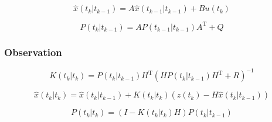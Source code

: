\documentclass[a4paper]{report}
\numberwithin{equation}{chapter}
\begin{document}
\begin{equation}
\hat{x} \left( t_k|t_{k-1} \right) = A\hat{x} \left( t_{k-1}|t_{k-1} \right) + Bu \left( t_k \right)
\end{equation}

\begin{equation}
P \left( t_k|t_{k-1} \right) = A P \left( t_{k-1}|t_{k-1} \right) A^{\mathrm{T}} + Q
\end{equation}

\subsubsection[Observation]{Observation}

\begin{equation}
K \left( t_k|t_k \right) = P \left( t_k|t_{k-1} \right) H^{\mathrm{T}} \left( HP \left( t_k|t_{k-1} \right) H^{\mathrm{T}} + R \right) ^{-1}
\end{equation}

\begin{equation}
\hat{x} \left( t_k|t_k \right) = \hat{x} \left( t_k|t_{k-1} \right) + K \left( t_k|t_k \right) \left( z \left(t_k \right) - H\hat{x} \left( t_k|t_{k-1} \right) \right)
\end{equation}

\begin{equation}
P \left( t_k|t_k \right) = \left( I - K \left( t_k|t_k \right)H \right) P \left( t_k|t_{k-1} \right)
\end{equation}
\end{document}
